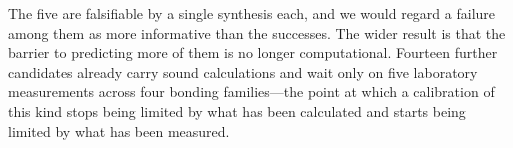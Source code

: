 The five are falsifiable by a single synthesis each, and we would regard a failure among them as
more informative than the successes. The wider result is that the barrier to predicting more of them
is no longer computational. Fourteen further candidates already carry sound calculations and wait
only on five laboratory measurements across four bonding families---the point at which a
calibration of this kind stops being limited by what has been calculated and starts being limited
by what has been measured.
